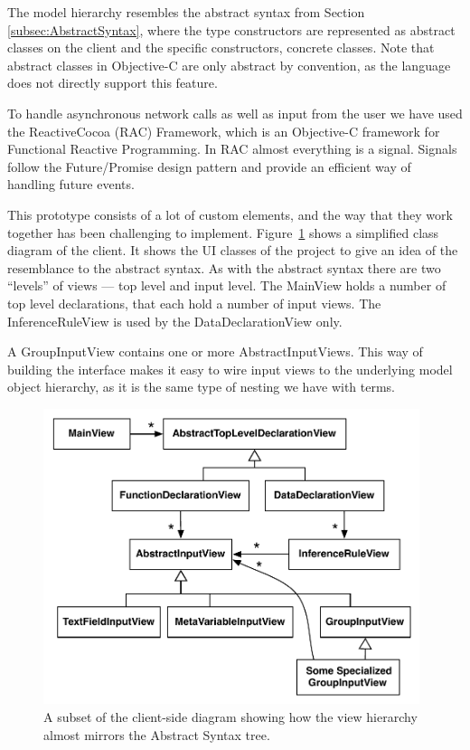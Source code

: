 The model hierarchy resembles the abstract syntax from Section \ref{subsec:AbstractSyntax},
where the type constructors are represented as abstract classes on the client
and the specific constructors, concrete classes. Note that abstract classes in
Objective-C are only abstract by convention, as the language does not directly
support this feature.

To handle asynchronous network calls as well as input from the user we have
used the ReactiveCocoa (RAC) Framework, which is an Objective-C framework for
Functional Reactive Programming. In RAC almost everything is a
signal. Signals follow the Future/Promise design pattern and provide an
efficient way of handling future events.


This prototype consists of a lot of custom elements, and the way that they work
together has been challenging to implement. Figure~\ref{fig:clientViewArchitecture} shows a simplified class diagram of the
client. It shows the UI classes of the project to give an idea of
the resemblance to the abstract syntax. As with the abstract syntax there are
two ``levels'' of views --- top level and input level. The MainView holds a
number of top level declarations, that each hold a number of input views. The
InferenceRuleView is used by the DataDeclarationView only.

A GroupInputView contains one or more AbstractInputViews. This way of building
the interface makes it easy to wire input views to the underlying model object
hierarchy, as it is the same type of nesting we have with terms. 

\begin{figure}
	\centering
		\includegraphics[width=110mm]{diagrams/client_side_class_diagram.pdf}
	\caption{A subset of the client-side diagram showing how the view hierarchy
	almost mirrors the Abstract Syntax tree.}
\label{fig:clientViewArchitecture}
\end{figure}












